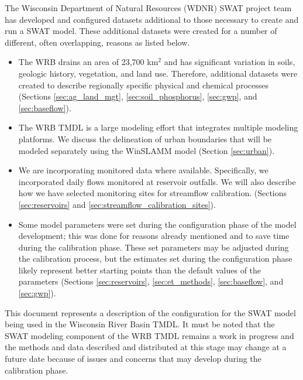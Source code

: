 The Wisconsin Department of Natural Resources (WDNR) SWAT project team has developed and configured datasets additional to those necessary to create and run a SWAT model. These additional datasets were created for a number of different, often overlapping, reasons as listed below. 
\begin{itemize}
\item The WRB drains an area of 23,700 km$^2$ and has significant variation in soils, geologic history, vegetation, and land use. Therefore, additional datasets were created to describe regionally specific physical and chemical processes (Sections \ref{sec:ag_land_mgt}, \ref{sec:soil_phosphorus}, \ref{sec:gwp}, and \ref{sec:baseflow}).

\item The WRB TMDL is a large modeling effort that integrates multiple modeling platforms. We discuss the delineation of urban boundaries that will be modeled separately using the WinSLAMM model (Section \ref{sec:urban}).

\item We are incorporating monitored data where available. Specifically, we incorporated daily flows monitored at reservoir outfalls. We will also describe how we have selected monitoring sites for streamflow calibration. (Sections \ref{sec:reservoirs} and \ref{sec:streamflow_calibration_sites}).
 
\item Some model parameters were set during the configuration phase of the model development; 
this was done for reasons already mentioned and to save time during the calibration phase. 
These set parameters may be adjusted during the calibration process, but the estimates set during the configuration phase likely represent better starting points than the default values of the parameters (Sections \ref{sec:reservoirs}, \ref{sec:et_methods}, \ref{sec:baseflow}, and \ref{sec:gwp}).
\end{itemize}

This document represents a description of the configuration for the SWAT model being used in the Wisconsin River Basin TMDL. 
It must be noted that the SWAT modeling component of the WRB TMDL remains a work in progress and the methods and data described and distributed at this stage may change at a future date because of issues and concerns that may develop during the calibration phase.



